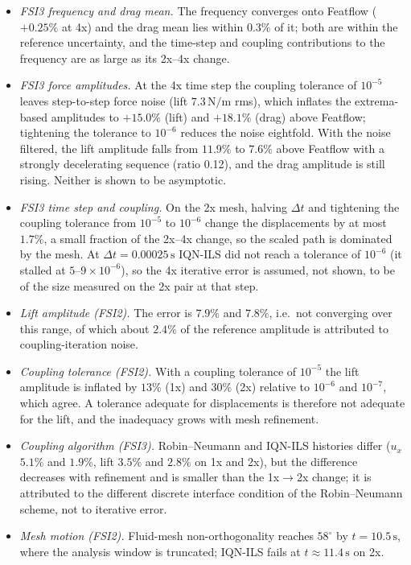 \begin{itemize}
	\item \emph{FSI3 frequency and drag mean.} The frequency converges onto Featflow ($+0.25\%$ at 4x) and the drag mean lies within $0.3\%$ of it; both are within the reference uncertainty, and the time-step and coupling contributions to the frequency are as large as its 2x--4x change.
	\item \emph{FSI3 force amplitudes.} At the 4x time step the coupling tolerance of $10^{-5}$ leaves step-to-step force noise (lift $7.3\,\mathrm{N/m}$ rms), which inflates the extrema-based amplitudes to $+15.0\%$ (lift) and $+18.1\%$ (drag) above Featflow; tightening the tolerance to $10^{-6}$ reduces the noise eightfold. With the noise filtered, the lift amplitude falls from $11.9\%$ to $7.6\%$ above Featflow with a strongly decelerating sequence (ratio 0.12), and the drag amplitude is still rising. Neither is shown to be asymptotic.
	\item \emph{FSI3 time step and coupling.} On the 2x mesh, halving $\Delta t$ and tightening the coupling tolerance from $10^{-5}$ to $10^{-6}$ change the displacements by at most $1.7\%$, a small fraction of the 2x--4x change, so the scaled path is dominated by the mesh. At $\Delta t = 0.00025\,\mathrm{s}$ IQN-ILS did not reach a tolerance of $10^{-6}$ (it stalled at $5$--$9\times10^{-6}$), so the 4x iterative error is assumed, not shown, to be of the size measured on the 2x pair at that step.
	\item \emph{Lift amplitude (FSI2).} The error is $7.9\%$ and $7.8\%$, i.e.\ not converging over this range, of which about $2.4\%$ of the reference amplitude is attributed to coupling-iteration noise.
	\item \emph{Coupling tolerance (FSI2).} With a coupling tolerance of $10^{-5}$ the lift amplitude is inflated by $13\%$ (1x) and $30\%$ (2x) relative to $10^{-6}$ and $10^{-7}$, which agree. A tolerance adequate for displacements is therefore not adequate for the lift, and the inadequacy grows with mesh refinement.
	\item \emph{Coupling algorithm (FSI3).} Robin--Neumann and IQN-ILS histories differ ($u_x$ $5.1\%$ and $1.9\%$, lift $3.5\%$ and $2.8\%$ on 1x and 2x), but the difference decreases with refinement and is smaller than the 1x$\to$2x change; it is attributed to the different discrete interface condition of the Robin--Neumann scheme, not to iterative error.
	\item \emph{Mesh motion (FSI2).} Fluid-mesh non-orthogonality reaches $58^\circ$ by $t = 10.5\,\mathrm{s}$, where the analysis window is truncated; IQN-ILS fails at $t \approx 11.4\,\mathrm{s}$ on 2x.
\end{itemize}

